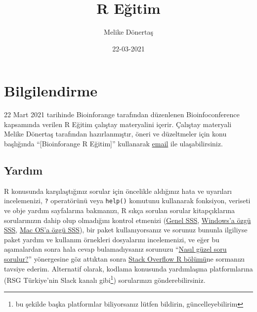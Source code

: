 \documentclass[
]{book}
\title{R Eğitim}
\author{Melike Dönertaş}
\date{22-03-2021}
\begin{document}
\maketitle

{
\setcounter{tocdepth}{1}
\tableofcontents
}
\hypertarget{bilgilendirme}{%
\chapter*{Bilgilendirme}\label{bilgilendirme}}

22 Mart 2021 tarihinde Bioinforange tarafından düzenlenen Bioinfoconference kapsamında verilen R Eğitim çalıştay materyalini içerir. Çalıştay materyali Melike Dönertaş tarafından hazırlanmıştır, öneri ve düzeltmeler için konu başlığında ``{[}Bioinforange R Eğitim{]}'' kullanarak \href{mailto:donertas.melike@gmail.com}{email} ile ulaşabilirsiniz.

\hypertarget{yardux131m}{%
\section*{Yardım}\label{yardux131m}}

R konusunda karşılaştığınız sorular için öncelikle aldığınız hata ve uyarıları incelemenizi, \texttt{?} operatörünü veya \texttt{help()} komutunu kullanarak fonksiyon, veriseti ve obje yardım sayfalarına bakmanızı, R sıkça sorulan sorular kitapçıklarına sorularınızın dahip olup olmadığını kontrol etmenizi (\href{https://cran.r-project.org/doc/FAQ/R-FAQ.html}{Genel SSS}, \href{https://cran.r-project.org/bin/windows/base/rw-FAQ.html}{Windows'a özgü SSS}, \href{https://cran.r-project.org/bin/macosx/RMacOSX-FAQ.html}{Mac OS'a özgü SSS}), bir paket kullanıyorsanız ve sorunuz bununla ilgiliyse paket yardım ve kullanım örnekleri dosyalarını incelemenizi, ve eğer bu aşamalardan sonra hala cevap bulamadıysanız sorunuzu ``\href{https://stackoverflow.com/help/how-to-ask}{Nasıl güzel soru sorulur?}'' yönergesine göz attıktan sonra \href{https://stackoverflow.com/questions/tagged/r}{Stack Overflow R bölümü}ne sormanızı tavsiye ederim. Alternatif olarak, kodlama konusunda yardımlaşma platformlarına (RSG Türkiye'nin Slack kanalı gibi\footnote{bu şekilde başka platformlar biliyorsanız lütfen bildirin, güncelleyebilirim}) sorularınızı gönderebilirsiniz.

  
\end{document}
